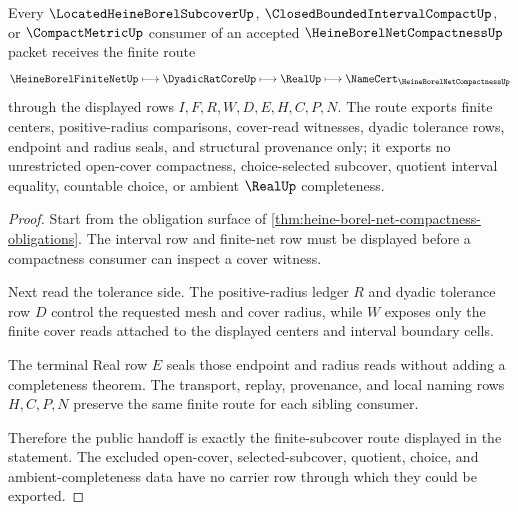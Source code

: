 \begin{theorem}
\label{thm:heine-borel-net-compactness-finite-subcover-route}
Every $\LocatedHeineBorelSubcoverUp$, $\ClosedBoundedIntervalCompactUp$, or $\CompactMetricUp$ consumer of an accepted $\HeineBorelNetCompactnessUp$ packet receives the finite route
$$
\HeineBorelFiniteNetUp
\longmapsto
\DyadicRatCoreUp
\longmapsto
\RealUp
\longmapsto
\NameCert_{\HeineBorelNetCompactnessUp}
$$
through the displayed rows $I,F,R,W,D,E,H,C,P,N$. The route exports finite centers, positive-radius comparisons, cover-read witnesses, dyadic tolerance rows, endpoint and radius seals, and structural provenance only; it exports no unrestricted open-cover compactness, choice-selected subcover, quotient interval equality, countable choice, or ambient $\RealUp$ completeness.
\end{theorem}
\begin{proof}
Start from the obligation surface of \autoref{thm:heine-borel-net-compactness-obligations}. The interval row and finite-net row must be displayed before a compactness consumer can inspect a cover witness.

Next read the tolerance side. The positive-radius ledger $R$ and dyadic tolerance row $D$ control the requested mesh and cover radius, while $W$ exposes only the finite cover reads attached to the displayed centers and interval boundary cells.

The terminal Real row $E$ seals those endpoint and radius reads without adding a completeness theorem. The transport, replay, provenance, and local naming rows $H,C,P,N$ preserve the same finite route for each sibling consumer.

Therefore the public handoff is exactly the finite-subcover route displayed in the statement. The excluded open-cover, selected-subcover, quotient, choice, and ambient-completeness data have no carrier row through which they could be exported.
\end{proof}



